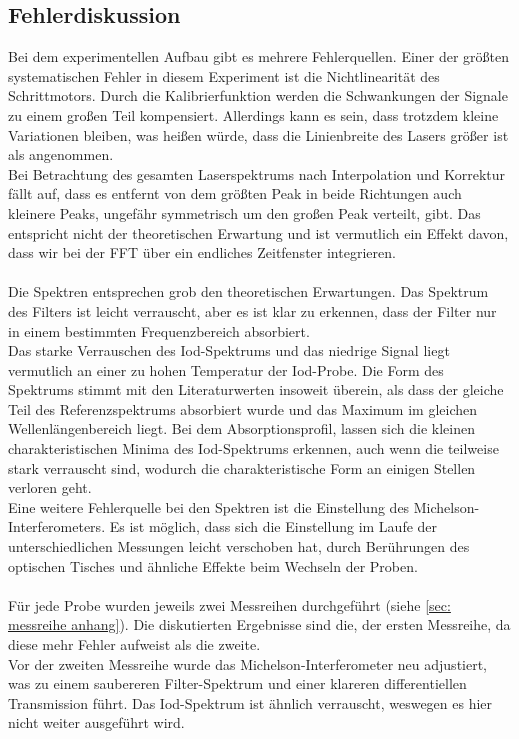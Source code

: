 \documentclass[10pt,a4paper]{article}
\begin{document}
\subsection{Fehlerdiskussion}
Bei dem experimentellen Aufbau gibt es mehrere Fehlerquellen. Einer der größten systematischen Fehler in diesem Experiment ist die Nichtlinearität des Schrittmotors. Durch die Kalibrierfunktion werden die Schwankungen der Signale zu einem großen Teil kompensiert. Allerdings kann es sein, dass trotzdem kleine Variationen bleiben, was heißen würde, dass die Linienbreite des Lasers größer ist als angenommen.\\
Bei Betrachtung des gesamten Laserspektrums nach Interpolation und Korrektur fällt auf, dass es entfernt von dem größten Peak in beide Richtungen auch kleinere Peaks, ungefähr symmetrisch um den großen Peak verteilt, gibt. Das entspricht nicht der theoretischen Erwartung und ist vermutlich ein Effekt davon, dass wir bei der FFT über ein endliches Zeitfenster integrieren.\\\\
Die Spektren entsprechen grob den theoretischen Erwartungen. Das Spektrum des Filters ist leicht verrauscht, aber es ist klar zu erkennen, dass der Filter nur in einem bestimmten Frequenzbereich absorbiert.\\
Das starke Verrauschen des Iod-Spektrums und das niedrige Signal liegt vermutlich an einer zu hohen Temperatur der Iod-Probe. Die Form des Spektrums stimmt mit den Literaturwerten insoweit überein, als dass der gleiche Teil des Referenzspektrums absorbiert wurde und das Maximum im gleichen Wellenlängenbereich liegt. Bei dem Absorptionsprofil, lassen sich die kleinen charakteristischen Minima des Iod-Spektrums erkennen, auch wenn die teilweise stark verrauscht sind, wodurch die charakteristische Form an einigen Stellen verloren geht.\\
Eine weitere Fehlerquelle bei den Spektren ist die Einstellung des Michelson-Interferometers. Es ist möglich, dass sich die Einstellung im Laufe der unterschiedlichen Messungen leicht verschoben hat, durch Berührungen des optischen Tisches und ähnliche Effekte beim Wechseln der Proben.\\\\
Für jede Probe wurden jeweils zwei Messreihen durchgeführt (siehe \autoref{sec: messreihe anhang}). Die diskutierten Ergebnisse sind die, der ersten Messreihe, da diese mehr Fehler aufweist als die zweite.\\Vor der zweiten Messreihe wurde das Michelson-Interferometer neu adjustiert, was zu einem saubereren Filter-Spektrum und einer klareren differentiellen Transmission führt. Das Iod-Spektrum ist ähnlich verrauscht, weswegen es hier nicht weiter ausgeführt wird.
\end{document}
